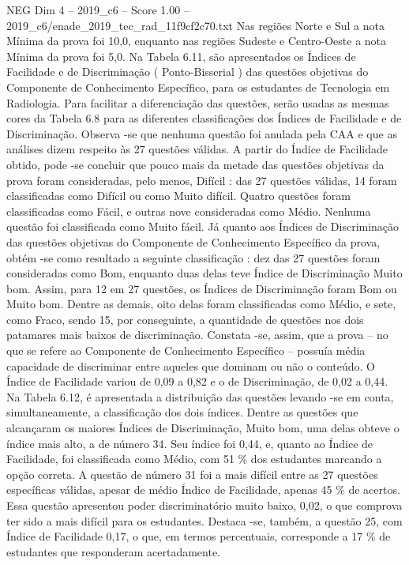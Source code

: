 \begin{textsample}{NEG Dim 4 – 2019\_c6 – Score 1.00 – 2019\_c6/enade\_2019\_tec\_rad\_11f9cf2c70.txt}
Nas regiões Norte e Sul a nota Mínima da prova foi 10,0, enquanto nas regiões Sudeste e Centro-Oeste a nota Mínima da prova foi 5,0.
Na Tabela 6.11, são apresentados os Índices de Facilidade e de Discriminação ( Ponto-Bisserial ) das questões objetivas do Componente de Conhecimento Específico, para os estudantes de Tecnologia em Radiologia.
Para facilitar a diferenciação das questões, serão usadas as mesmas cores da Tabela 6.8 para as diferentes classificações dos Índices de Facilidade e de Discriminação.
Observa -se que nenhuma questão foi anulada pela CAA e que as análises dizem respeito às 27 questões válidas.
A partir do Índice de Facilidade obtido, pode -se concluir que pouco mais da metade das questões objetivas da prova foram consideradas, pelo menos, Difícil : das 27 questões válidas, 14 foram classificadas como Difícil ou como Muito difícil.
Quatro questões foram classificadas como Fácil, e outras nove consideradas como Médio.
Nenhuma questão foi classificada como Muito fácil.
Já quanto aos Índices de Discriminação das questões objetivas do Componente de Conhecimento Específico da prova, obtém -se como resultado a seguinte classificação : dez das 27 questões foram consideradas como Bom, enquanto duas delas teve Índice de Discriminação Muito bom.
Assim, para 12 em 27 questões, os Índices de Discriminação foram Bom ou Muito bom.
Dentre as demais, oito delas foram classificadas como Médio, e sete, como Fraco, sendo 15, por conseguinte, a quantidade de questões nos dois patamares mais baixos de discriminação.
Constata -se, assim, que a prova – no que se refere ao Componente de Conhecimento Específico – possuía média capacidade de discriminar entre aqueles que dominam ou não o conteúdo.
O Índice de Facilidade variou de 0,09 a 0,82 e o de Discriminação, de 0,02 a 0,44.
Na Tabela 6.12, é apresentada a distribuição das questões levando -se em conta, simultaneamente, a classificação dos dois índices.
Dentre as questões que alcançaram os maiores Índices de Discriminação, Muito bom, uma delas obteve o índice mais alto, a de número 34.
Seu índice foi 0,44, e, quanto ao Índice de Facilidade, foi classificada como Médio, com 51 \% dos estudantes marcando a opção correta.
A questão de número 31 foi a mais difícil entre as 27 questões específicas válidas, apesar de médio Índice de Facilidade, apenas 45 \% de acertos.
Essa questão apresentou poder discriminatório muito baixo, 0,02, o que comprova ter sido a mais difícil para os estudantes.
Destaca -se, também, a questão 25, com Índice de Facilidade 0,17, o que, em termos percentuais, corresponde a 17 \% de estudantes que responderam acertadamente.

\end{textsample}
